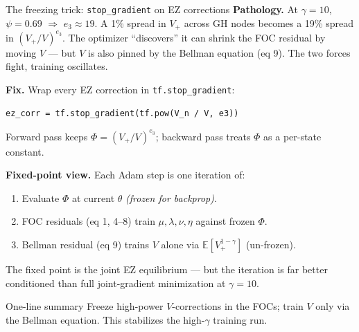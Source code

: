 \documentclass[aspectratio=169,11pt]{beamer}
\newcommand{\emphc}[1]{\textcolor{harvardcrimson}{#1}}
\begin{document}
\begin{frame}{The freezing trick: \texttt{stop\_gradient} on EZ corrections}
\footnotesize
\textbf{Pathology.} At $\gamma = 10$, $\psi = 0.69$ $\Rightarrow$ $e_3 \approx 19$. A 1\% spread in $V_+$ across GH nodes becomes a 19\% spread in $(V_+/V)^{e_3}$. The optimizer ``discovers'' it can shrink the FOC residual by moving $V$ --- but $V$ is also pinned by the Bellman equation (eq 9). The two forces fight, training oscillates.

\textbf{Fix.} Wrap every EZ correction in \texttt{tf.stop\_gradient}:
\begin{center}
\texttt{ez\_corr = tf.stop\_gradient(tf.pow(V\_n / V, e3))}
\end{center}
Forward pass keeps $\Phi = (V_+/V)^{e_3}$; backward pass treats $\Phi$ as a per-state \emphc{constant}.

\textbf{Fixed-point view.} Each Adam step is one iteration of:
\begin{enumerate}\setlength\itemsep{0pt}
    \item Evaluate $\Phi$ at current $\theta$ \emph{(frozen for backprop)}.
    \item FOC residuals (eq 1, 4--8) train $\mu, \lambda, \nu, \eta$ against frozen $\Phi$.
    \item Bellman residual (eq 9) trains $V$ alone via $\mathbb{E}[V_+^{1-\gamma}]$ (un-frozen).
\end{enumerate}
The fixed point is the joint EZ equilibrium --- but the iteration is far better conditioned than full joint-gradient minimization at $\gamma = 10$.

\begin{alertblock}{One-line summary}
Freeze high-power $V$-corrections in the FOCs; train $V$ \emphc{only} via the Bellman equation. This stabilizes the high-$\gamma$ training run.
\end{alertblock}
\end{frame}
\end{document}
